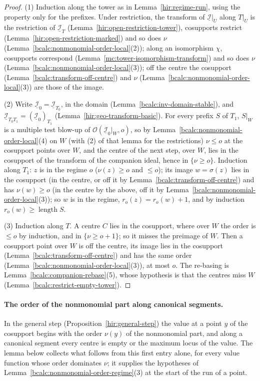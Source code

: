 \begin{proof}
\mixedleanok
(1) Induction along the tower as in Lemma~\ref{hir:regime-run}, using the property only for the prefixes. Under restriction, the transform of
\(\underline{\mathcal I}|_U\) along \(T|_U\) is the restriction of \(\underline{\mathcal I}_T\) (Lemma~\ref{hir:open-restriction-tower}), cosupports restrict
(Lemma~\ref{hir:open-restriction-marked}) and so does \(\nu\) (Lemma~\ref{bcalc:nonmonomial-order-local}(2)); along an isomorphism \(\chi\), cosupports
correspond (Lemma~\ref{mc:tower-isomorphism-transform}) and so does \(\nu\) (Lemma~\ref{bcalc:nonmonomial-order-local}(3)); off the centre the cosupport
(Lemma~\ref{bcalc:transform-off-centre}) and \(\nu\) (Lemma~\ref{bcalc:nonmonomial-order-local}(3)) are those of the image.

(2) Write \(\underline{\mathcal I}_0=\underline{\mathcal I}_{T_0}\), in the domain (Lemma~\ref{bcalc:inv-domain-stable}), and \(\underline{\mathcal I}_{T_0T_1}=(\underline{\mathcal I}_0)_{T_1}\)
(Lemma~\ref{hir:geo-transform-basic}). For every prefix \(S\) of \(T_1\), \(S|_W\) is a multiple test blow-up of \(\mathcal O(\underline{\mathcal I}_0|_W,o)\), so by
Lemma~\ref{bcalc:nonmonomial-order-local}(4) on \(W\) (with (2) of that lemma for the restrictions) \(\nu\le o\) at the cosupport points over \(W\), and the
centre of the next step, over \(W\), lies in the cosupport of the transform of the companion ideal, hence in \(\{\nu\ge o\}\). Induction along \(T_1\): \(z\) is
in the regime \(o\) (\(\nu(z)\ge o\) and \(\le o\)); its image \(w=\sigma(z)\) lies in the cosupport (in the centre, or off it by
Lemma~\ref{bcalc:transform-off-centre}) and has \(\nu(w)\ge o\) (in the centre by the above, off it by Lemma~\ref{bcalc:nonmonomial-order-local}(3)); so
\(w\) is in the regime, \(r_o(z)=r_o(w)+1\), and by induction \(r_o(w)\ge\operatorname{length}S\).

(3) Induction along \(T\). A centre \(C\) lies in the cosupport, where over \(W\) the order is \(\le o\) by induction, and in \(\{\nu\ge o+1\}\); so it misses
the preimage of \(W\). Then a cosupport point over \(W\) is off the centre, its image lies in the cosupport (Lemma~\ref{bcalc:transform-off-centre}) and has
the same order (Lemma~\ref{bcalc:nonmonomial-order-local}(3)), at most \(o\). The re-basing is Lemma~\ref{bcalc:companion-rebase}(5), whose hypothesis is that the
centres miss \(W\) (Lemma~\ref{bcalc:restrict-empty-tower}).
\end{proof}

\paragraph{The order of the nonmonomial part along canonical segments.} In the general step (Proposition~\ref{hir:general-step}) the value at a point
\(y\) of the cosupport begins with the order \(\nu(y)\) of the nonmonomial part, and along a canonical segment every centre is empty or the maximum locus of
the value. The lemma below collects what follows from this first entry alone, for every value function whose order dominates \(\nu\); it supplies the
hypotheses of Lemma~\ref{bcalc:nonmonomial-order-regime}(3) at the start of the run of a point.

